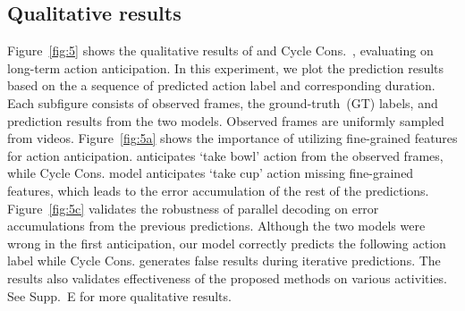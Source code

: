 \subsection{Qualitative results}
Figure~\ref{fig:5} shows the qualitative results of \ours and Cycle Cons.~\cite{farha2020long}, evaluating on long-term action anticipation. In this experiment, we plot the prediction results based on the a sequence of predicted action label and corresponding duration. Each subfigure consists of observed frames, the ground-truth~(GT) labels, and prediction results from the two models. Observed frames are uniformly sampled from videos.
Figure~\ref{fig:5a} shows the importance of utilizing fine-grained features for action anticipation. 
\ours anticipates `take bowl' action from the observed frames, while Cycle Cons. model anticipates `take cup' action missing fine-grained features, which leads to the error accumulation of the rest of the predictions.
Figure~\ref{fig:5c} validates the robustness of parallel decoding on error accumulations from the previous predictions. Although the two models were wrong in the first anticipation, our model correctly predicts the following action label while Cycle Cons. generates false results during iterative predictions.
The results also validates effectiveness of the proposed methods on various activities.
See Supp.~E for more qualitative results.